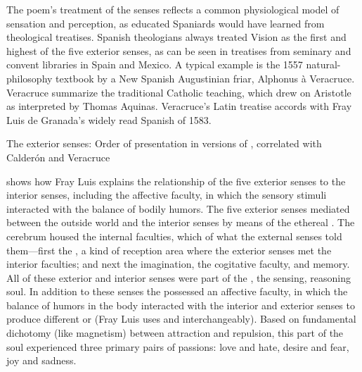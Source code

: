 The poem's treatment of the senses reflects a common physiological model of sensation and perception, as educated Spaniards would have learned from theological treatises.
Spanish theologians always treated Vision as the first and highest of the five exterior senses, as can be seen in treatises from seminary and convent libraries in Spain and Mexico.
A typical example is the 1557 natural-philosophy textbook  by a New Spanish Augustinian friar, Alphonus à Veracruce.%
\Autocite{Veracruce:Phisica}
Veracruce summarize the traditional Catholic teaching, which drew on Aristotle as interpreted by Thomas Aquinas.%
Veracruce's Latin treatise accords with Fray Luis de Granada's widely read Spanish  of 1583.%
\Autocites{LuisdeGranada:Simbolo}[(part I)]{LuisdeGranada-Balcells:SimboloPtI}

\begin{table}
  \caption{The exterior senses: Order of presentation in versions of , correlated with Calderón and Veracruce}
  \label{table:senses-order}
\end{table}

 shows how Fray Luis explains the relationship of the five exterior senses to the interior senses, including the affective faculty, in which the sensory stimuli interacted with the balance of bodily humors.
The five exterior senses mediated between the outside world and the interior senses by means of the ethereal .
The cerebrum housed the internal faculties, which  of what the external senses told them---first the , a kind of reception area where the exterior senses met the interior faculties; and next the imagination, the cogitative faculty, and memory.
All of these exterior and interior senses were part of the , the sensing, reasoning soul.
In addition to these senses the  possessed an affective faculty, in which the balance of humors in the body interacted with the interior and exterior senses to produce different  or  (Fray Luis uses  and  interchangeably).
Based on fundamental dichotomy (like magnetism) between attraction and repulsion, this  part of the soul experienced three primary pairs of passions: love and hate, desire and fear, joy and sadness.

